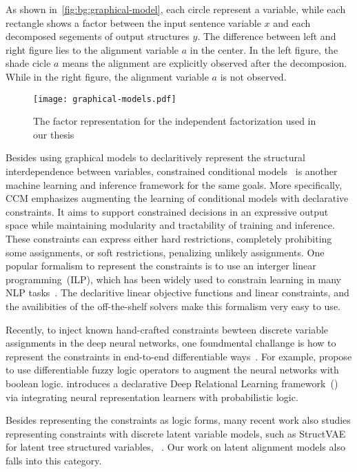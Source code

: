 As shown in~\autoref{fig:bg:graphical-model}, each circle represent a
variable, while each rectangle shows a factor between the input
sentence variable $x$ and each decomposed segements of output
structures $y$. The difference between left and right figure lies to
the alignment variable $a$ in the center. In the left figure, the
shade cicle $a$ means the alignment are explicitly observed after the
decomposion. While in the right figure, the alignment variable $a$ is
not observed.

\begin{figure}[!th]
\centering
\texttt{[image: graphical-models.pdf]}
\caption{\label{fig:bg:graphical-model}The factor representation for
  the independent factorization used in our thesis}
\end{figure}

 Besides using graphical
models to declaritively represent the structural interdependence
between variables, constrained conditional
models~\citep[CCM,][]{chang2012structured} is another machine learning
and inference framework for the same goals. More specifically, CCM
emphasizes augmenting the learning of conditional models with
declarative constraints. It aims to support constrained decisions in
an expressive output space while maintaining modularity and
tractability of training and inference. These constraints can express
either hard restrictions, completely prohibiting some assignments, or
soft restrictions, penalizing unlikely assignments. One popular
formalism to represent the constraints is to use an interger linear
programming~(ILP), which has been widely used to constrain learning in
many NLP tasks~\citep{roth2007global}. The declaritive linear
objective functions and linear constraints, and the availibities of
the off-the-shelf solvers make this formalism very easy to use.

Recently, to inject known hand-crafted constraints bewteen discrete
variable assignments in the deep neural networks, one foundmental
challange is how to represent the constraints in end-to-end
differentiable ways~\cite{bach2017hinge}. For example,
\citet{li2019augmenting} propose to use differentiable fuzzy logic
operators to augment the neural networks with boolean
logic. \citet{pacheco2021modeling} introduces a declarative Deep
Relational Learning framework~(\DRAIL) via integrating neural
representation learners with probabilistic logic.

Besides representing the constraints as logic forms, many recent work
also studies representing constraints with discrete latent variable
models, such as StructVAE for latent tree structured variables,
~\cite{yin2018structvae, corro2019learning}. Our work on latent
alignment models also falls into this category.

